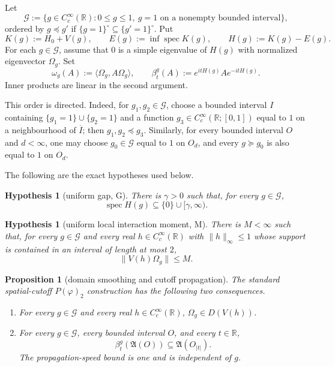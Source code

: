 \documentclass[11pt,a4paper]{article}
\newtheorem{proposition}[theorem]{Proposition}
\newtheorem{hypothesis}[theorem]{Hypothesis}
\theoremstyle{remark}
\newcommand{\R}{\mathbb R}
\newcommand{\A}{\mathfrak A}
\newcommand{\G}{\mathcal G}
\newcommand{\Om}{\Omega}
\DeclareMathOperator{\spec}{spec}
\begin{document}
Let
\[
 \G:=\{g\in C_c^\infty(\R):0\le g\le1,\ g=1
 \text{ on a nonempty bounded interval}\},
\]
ordered by $g\preccurlyeq g'$ if $\{g=1\}^\circ\subseteq\{g'=1\}^\circ$.  Put
\[
 K(g):=H_0+V(g),\qquad E(g):=\inf\spec K(g),\qquad H(g):=K(g)-E(g).
\]
For each $g\in\G$, assume that $0$ is a simple eigenvalue of $H(g)$ with normalized eigenvector
$\Om_g$.  Set
\[
 \omega_g(A):=\langle\Om_g,A\Om_g\rangle,
 \qquad \beta_t^g(A):=e^{itH(g)}Ae^{-itH(g)}.
\]
Inner products are linear in the second argument.

This order is directed.  Indeed, for $g_1,g_2\in\G$, choose a bounded interval $I$ containing
$\{g_1=1\}\cup\{g_2=1\}$ and a function $g_3\in C_c^\infty(\R;[0,1])$ equal to $1$ on a
neighbourhood of $\overline I$; then $g_1,g_2\preccurlyeq g_3$.  Similarly, for every bounded
interval $O$ and $d<\infty$, one may choose $g_0\in\G$ equal to $1$ on $O_d$, and every
$g\succcurlyeq g_0$ is also equal to $1$ on $O_d$.

The following are the exact hypotheses used below.

\begin{hypothesis}[uniform gap, G]\label{hyp:G}
There is $\gamma>0$ such that, for every $g\in\G$,
\[
 \spec H(g)\subseteq\{0\}\cup[\gamma,\infty).
\]
\end{hypothesis}

\begin{hypothesis}[uniform local interaction moment, M]\label{hyp:M}
There is $M<\infty$ such that, for every $g\in\G$ and every real
$h\in C_c^\infty(\R)$ with $\|h\|_\infty\le1$ whose support is contained in an interval of length
at most $2$,
\[
 \|V(h)\Om_g\|\le M.
\]
\end{hypothesis}

\begin{proposition}[domain smoothing and cutoff propagation]\label{prop:standard}
The standard spatial-cutoff $P(\varphi)_2$ construction has the following two consequences.
\begin{enumerate}
\item For every $g\in\G$ and every real $h\in C_c^\infty(\R)$,
$\Om_g\in D(V(h))$.
\item For every $g\in\G$, every bounded interval $O$, and every $t\in\R$,
\[
 \beta_t^g(\A(O))\subseteq\A(O_{|t|}).
\]
The propagation-speed bound is one and is independent of $g$.
\end{enumerate}
\end{proposition}
\end{document}
